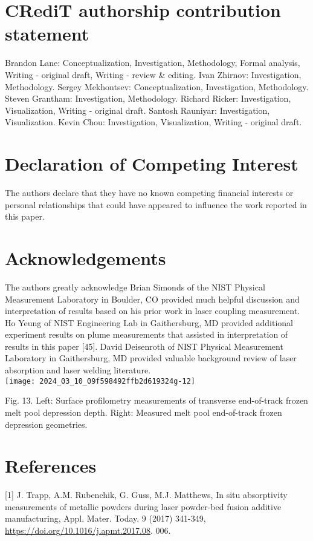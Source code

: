 \documentclass[10pt]{article}
\begin{document}
\section*{CRediT authorship contribution statement}
Brandon Lane: Conceptualization, Investigation, Methodology, Formal analysis, Writing - original draft, Writing - review \& editing. Ivan Zhirnov: Investigation, Methodology. Sergey Mekhontsev: Conceptualization, Investigation, Methodology. Steven Grantham: Investigation, Methodology. Richard Ricker: Investigation, Visualization, Writing - original draft. Santosh Rauniyar: Investigation, Visualization. Kevin Chou: Investigation, Visualization, Writing - original draft.

\section*{Declaration of Competing Interest}
The authors declare that they have no known competing financial interests or personal relationships that could have appeared to influence the work reported in this paper.

\section*{Acknowledgements}
The authors greatly acknowledge Brian Simonds of the NIST Physical Measurement Laboratory in Boulder, CO provided much helpful discussion and interpretation of results based on his prior work in laser coupling measurement. Ho Yeung of NIST Engineering Lab in Gaithersburg, MD provided additional experiment results on plume measurements that assisted in interpretation of results in this paper [45]. David Deisenroth of NIST Physical Measurement Laboratory in Gaithersburg, MD provided valuable background review of laser absorption and laser welding literature.\\
\texttt{[image: 2024\_03\_10\_09f598492ffb2d619324g-12]}

Fig. 13. Left: Surface profilometry measurements of transverse end-of-track frozen melt pool depression depth. Right: Measured melt pool end-of-track frozen depression geometries.

\section*{References}
[1] J. Trapp, A.M. Rubenchik, G. Guss, M.J. Matthews, In situ absorptivity measurements of metallic powders during laser powder-bed fusion additive manufacturing, Appl. Mater. Today. 9 (2017) 341-349, \href{https://doi.org/10.1016/j.apmt.2017.08}{https://doi.org/10.1016/j.apmt.2017.08}. 006.
\end{document}

